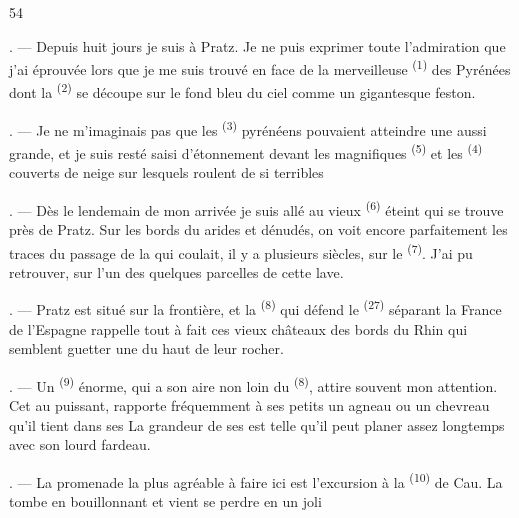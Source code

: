 \begin{VUpage}[56]{54}
\VUsaut{4.0mm}
\VUsaut{3.0mm}

\VUsaut{3.0mm}

\VUsaut{3.0mm}

. --- Depuis huit jours je suis à Pratz. Je ne puis\nl
exprimer toute l'admiration que j'ai éprouvée lors\cc
que je me suis trouvé en face de la merveilleuse\nl
{} \textsuperscript{(1)} des Pyrénées dont la  \textsuperscript{(2)} se découpe\nl
sur le fond bleu du ciel comme un gigantesque feston.

. --- Je ne m'imaginais pas que les  \textsuperscript{(3)}\nl
pyrénéens pouvaient atteindre une  aussi\nl
grande, et je suis resté saisi d'étonnement devant les\nl
magnifiques  \textsuperscript{(5)} et les  \textsuperscript{(4)} couverts de\nl
neige sur lesquels roulent de si terribles 

. --- Dès le lendemain de mon arrivée je suis allé\nl
au vieux  \textsuperscript{(6)} éteint qui se trouve près de Pratz.\nl
Sur les bords du  arides et dénudés, on voit\nl
encore parfaitement les traces du passage de la \nl
qui coulait, il y a plusieurs siècles, sur le \nl
{} \textsuperscript{(7)}. J'ai pu retrouver, sur l'un des \cc
{} quelques parcelles de cette lave.

. --- Pratz est situé sur la frontière, et la \cc
{} \textsuperscript{(8)} qui défend le  \textsuperscript{(27)} séparant la France de\nl
l'Espagne rappelle tout à fait ces vieux châteaux des\nl
bords du Rhin qui semblent guetter une  du\nl
haut de leur rocher.

. --- Un  \textsuperscript{(9)} énorme, qui a son aire non loin du\nl
{} \textsuperscript{(8)}, attire souvent mon attention. Cet \nl
{} au  puissant, rapporte fréquemment à ses\nl
petits un agneau ou un chevreau qu'il tient dans ses\nl
{} La grandeur de ses  est telle qu'il peut\nl
planer assez longtemps avec son lourd fardeau.

. --- La promenade la plus agréable à faire ici est\nl
l'excursion à la  \textsuperscript{(10)} de Cau. La \nl
tombe en bouillonnant et vient se perdre en un joli
\parplein
\end{VUpage}

